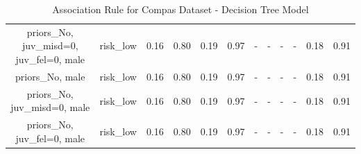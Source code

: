 \begin{table}[H]
{\begin{tabular}{|c|c|c|c|c|c|c|c|c|c|c|c|}
priors\_No, juv\_misd=0, juv\_fel=0, male & risk\_low & 0.16 & 0.80 & 0.19 & 0.97 & - & - & - & - & 0.18 & 0.91 \\
priors\_No, male & risk\_low & 0.16 & 0.80 & 0.19 & 0.97 & - & - & - & - & 0.18 & 0.91 \\
priors\_No, juv\_misd=0, male & risk\_low & 0.16 & 0.80 & 0.19 & 0.97 & - & - & - & - & 0.18 & 0.91 \\
priors\_No, juv\_fel=0, male & risk\_low & 0.16 & 0.80 & 0.19 & 0.97 & - & - & - & - & 0.18 & 0.91 \\
        \hline
        \end{tabular}
        }
        \\[10pt]
        \caption{Association Rule for Compas Dataset - Decision Tree Model}
        \label{table:asso_rules_compas_Decision Tree}
        \end{table}
        